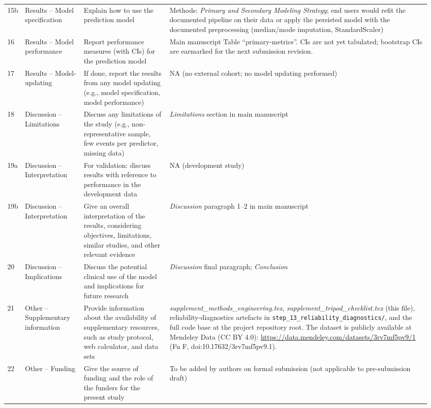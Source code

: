 \documentclass[11pt,a4paper]{article}
\begin{document}
\begin{longtable}{p{0.9cm} p{2.8cm} p{4.6cm} p{6.6cm}}
15b & Results -- Model specification & Explain how to use the prediction model & Methods: \emph{Primary and Secondary Modeling Strategy}; end users would refit the documented pipeline on their data or apply the persisted model with the documented preprocessing (median/mode imputation, StandardScaler) \\
16 & Results -- Model performance & Report performance measures (with CIs) for the prediction model & Main manuscript Table ``primary-metrics''. CIs are not yet tabulated; bootstrap CIs are earmarked for the next submission revision. \\
17 & Results -- Model-updating & If done, report the results from any model updating (e.g., model specification, model performance) & NA (no external cohort; no model updating performed) \\
18 & Discussion -- Limitations & Discuss any limitations of the study (e.g., non-representative sample, few events per predictor, missing data) & \emph{Limitations} section in main manuscript \\
19a & Discussion -- Interpretation & For validation: discuss results with reference to performance in the development data & NA (development study) \\
19b & Discussion -- Interpretation & Give an overall interpretation of the results, considering objectives, limitations, similar studies, and other relevant evidence & \emph{Discussion} paragraph 1--2 in main manuscript \\
20 & Discussion -- Implications & Discuss the potential clinical use of the model and implications for future research & \emph{Discussion} final paragraph; \emph{Conclusion} \\
21 & Other -- Supplementary information & Provide information about the availability of supplementary resources, such as study protocol, web calculator, and data sets & \emph{supplement\_methods\_engineering.tex}, \emph{supplement\_tripod\_checklist.tex} (this file), reliability-diagnostics artefacts in \texttt{step\_13\_reliability\_diagnostics/}, and the full code base at the project repository root. The dataset is publicly available at Mendeley Data (CC BY 4.0): \url{https://data.mendeley.com/datasets/3rv7mf5pv9/1} (Fu F, doi:10.17632/3rv7mf5pv9.1). \\
22 & Other -- Funding & Give the source of funding and the role of the funders for the present study & To be added by authors on formal submission (not applicable to pre-submission draft) \\
\bottomrule
\end{longtable}
\end{document}
